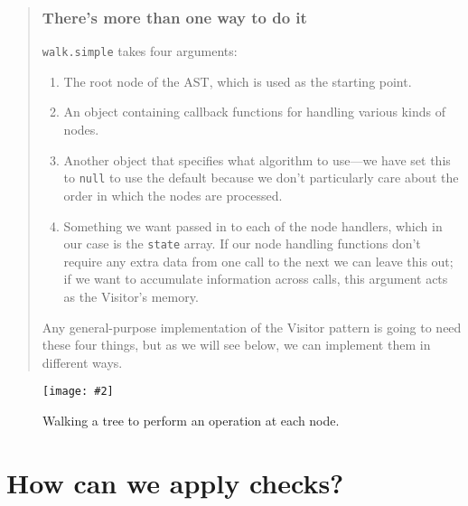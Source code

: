 \documentclass[krantzl]{krantz}
\newcommand{\figpdfhere}[4]{\begin{figure}[h]%
\centering%
\texttt{[image: \#2]}%
\caption{#3}%
\label{#1}%
\end{figure}}
\newenvironment{callout}{\savenotes\begin{tBox}\begin{quotation}\toggletrue{inbox}\renewcommand{\thempfootnote}{\arabic{footnote}}}{\end{quotation}\vspace{\baselineskip}\end{tBox}\togglefalse{inbox}\spewnotes}
\begin{document}
\begin{callout}


\subsubsection*{There’s more than one way to do it}


\texttt{walk.simple} takes four arguments:

\begin{enumerate}

\item 

The root node of the AST, which is used as the starting point.



\item 

An object containing callback functions for handling various kinds of nodes.



\item 

Another object that specifies what algorithm to use—we have set this to \texttt{null}
    to use the default because
    we don’t particularly care about the order in which the nodes are processed.



\item 

Something we want passed in to each of the node handlers,
    which in our case is the \texttt{state} array.
    If our node handling functions don’t require any extra data
    from one call to the next
    we can leave this out;
    if we want to accumulate information across calls,
    this argument acts as the Visitor’s memory.



\end{enumerate}


\noindent Any general-purpose implementation of the Visitor pattern
is going to need these four things,
but as we will see below,
we can implement them in different ways.

\end{callout}

\figpdfhere{style-checker-walk-tree}{./style-checker/walk-tree.pdf}{Walking a tree to perform an operation at each node.}{0.6}

\section{How can we apply checks?}\label{style-checker-apply}
\end{document}
